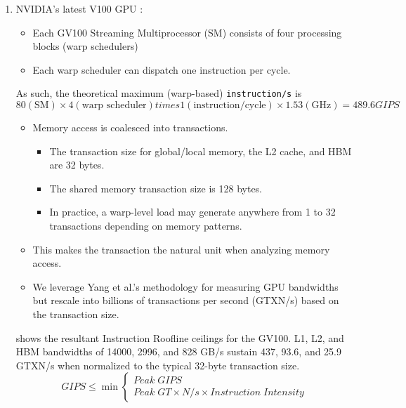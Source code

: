 \documentclass{article}
\begin{document}
\begin{enumerate}
\item  NVIDIA’s latest V100 GPU : 
\begin{itemize}
 \item Each GV100 Streaming Multiprocessor (SM) consists of four processing blocks (warp schedulers)
 \item Each warp scheduler can dispatch one instruction per cycle. 
\end{itemize}
As such, the theoretical maximum (warp-based) \verb+instruction/s+ is
\begin{equation}
 80(\mbox{SM}) \times 4(\mbox{warp scheduler}) times 1(\mbox{instruction/cycle}) \times 1.53(\mbox{GHz}) = 489.6 GIPS
\end{equation}
\begin{itemize}
\item Memory access is coalesced into transactions. 
\begin{itemize}
\item The transaction size for global/local memory, the L2 cache, and HBM are 32 bytes. 
\item The shared memory transaction size is 128 bytes. 
\item In practice, a warp-level load may generate anywhere from 1 to 32 transactions depending on memory patterns. 
\end{itemize}
\item This makes the transaction the natural unit when analyzing memory access. 
\item We leverage Yang et al.’s methodology for measuring GPU bandwidths but rescale into billions of transactions per second (GTXN/s) based on the transaction size.
\end{itemize}
shows the resultant Instruction Roofline ceilings for the GV100. L1, L2, and HBM bandwidths of 14000, 2996, and 828 GB/s sustain 437, 93.6, and 25.9 GTXN/s when normalized to
the typical 32-byte transaction size.
\begin{equation}
 GIPS \leq \min \left\{\begin{array}{l}
 Peak \; GIPS \\
 Peak \;GT\times N/s \times Instruction\; Intensity
\end{array}\right.
\label{Roofline_eq_1}
\end{equation}


\end{enumerate}
\end{document}
